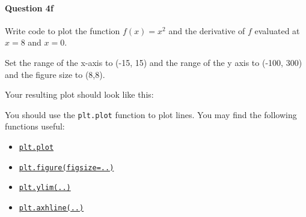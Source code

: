 \documentclass[11pt]{article}
\providecommand{\tightlist}{%
      \setlength{\itemsep}{0pt}\setlength{\parskip}{0pt}}
\begin{document}
    \paragraph{Question 4f}\label{question-4f}

Write code to plot the function \(f(x) = x^2\) and the derivative of
\(f\) evaluated at \(x=8\) and \(x=0\).

Set the range of the x-axis to (-15, 15) and the range of the y axis to
(-100, 300) and the figure size to (8,8).

Your resulting plot should look like this:

You should use the \texttt{plt.plot} function to plot lines. You may
find the following functions useful:

\begin{itemize}
\tightlist
\item
  \href{https://matplotlib.org/api/_as_gen/matplotlib.pyplot.plot.html}{\texttt{plt.plot}}
\item
  \href{https://stackoverflow.com/questions/332289/how-do-you-change-the-size-of-figures-drawn-with-matplotlib}{\texttt{plt.figure(figsize=..)}}
\item
  \href{https://matplotlib.org/api/_as_gen/matplotlib.pyplot.ylim.html}{\texttt{plt.ylim(..)}}
\item
  \href{https://matplotlib.org/api/_as_gen/matplotlib.pyplot.hlines.html}{\texttt{plt.axhline(..)}}
\end{itemize}

    
\end{document}

